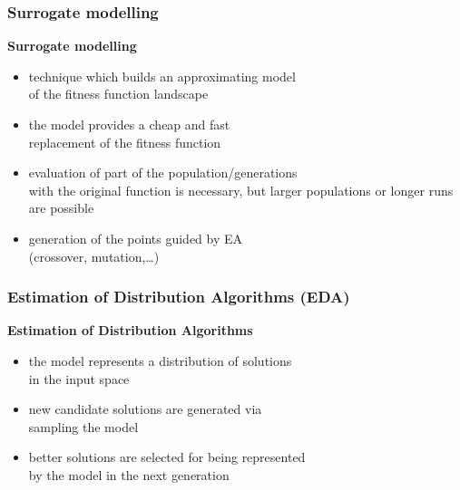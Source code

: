 \documentclass[sans,mathserif]{beamer}
\newcommand{\blue}[1]{{\color{blue} #1}}
\begin{document}

\begin{frame}
  \frametitle{Surrogate modelling}
  \textbf{Surrogate modelling}
  \begin{itemize}
    \item technique which builds an \alert{approximating model} \\
      of the fitness function landscape
    \item the model provides a \alert{cheap and fast} \\
      replacement of the fitness function
    \item evaluation of \blue{part} of the population/generations \\ with the \blue{original
      function} is necessary, but \alert{larger populations} or longer runs are possible
    \item generation of the points guided by EA \\
      (crossover, mutation,\ldots)
  \end{itemize}
\end{frame}

\begin{frame}
  \frametitle{Estimation of Distribution Algorithms (EDA)}
  \textbf{Estimation of Distribution Algorithms}
  \begin{itemize}
    \item the model represents a \alert{distribution} of solutions \\ in the \blue{input space}
    \item new candidate solutions are generated via \\ \alert{sampling the model}
    \item better solutions are selected for being represented \\ by the model in the next generation
  \end{itemize}
\end{frame}
\end{document}
